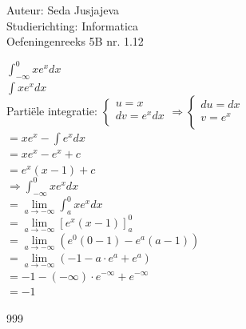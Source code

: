 \documentclass[a4paper]{article}
\newcommand{\integral}{\displaystyle\int}
\newcommand{\limit}{\lim\limits}
\begin{document}
\noindent \large Auteur: Seda Jusjajeva\\
\noindent \large Studierichting: Informatica\\
\noindent \large Oefeningenreeks 5B nr. 1.12\\

\medskip

\normalsize


$\integral_{-\infty}^{0} xe^x dx$ \\

$\integral xe^x dx$ \\

Partiële integratie: $\left\{\begin{array}{l}
   u = x \\
   dv = e^xdx \\
\end{array}\right.\Rightarrow\left\{\begin{array}{l}
   du = dx \\
   v = e^x \\
\end{array}\right.$ \\

$= x e^x - \integral e^xdx$ \\

$= x e^x - e^x + c$ \\

$= e^x(x - 1) + c$ \\


$\Rightarrow \integral_{-\infty}^{0} xe^x dx$ \\

$= \limit_{a \to -\infty} \integral_{a}^{0} x e^xdx$ \\

$= \limit_{a \to -\infty} [e^x(x - 1)]_{a}^{0}$ \\

$= \limit_{a \to -\infty} \left(e^0(0 - 1) - e^a(a - 1)\right)$ \\

$= \limit_{a \to -\infty} \left(-1 - a\cdot e^a + e^a\right)$ \\

$= -1 - (-\infty)\cdot e^{-\infty} + e^{-\infty}$ \\

$= -1$ \\



\begin{thebibliography}{999}
\end{thebibliography}
\end{document}
